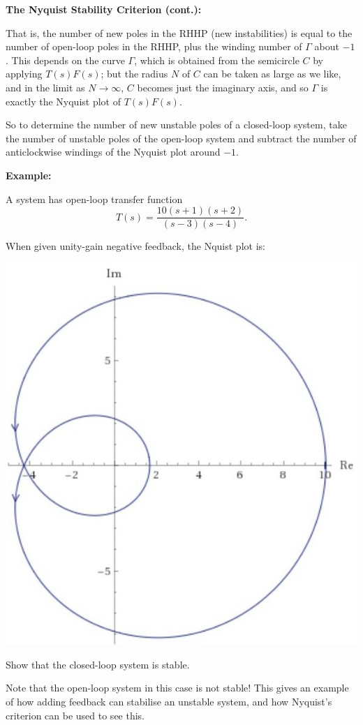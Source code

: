 \documentclass{article}
\begin{document}
\clearpage


\textbf{The Nyquist Stability Criterion (cont.):}\bigskip


That is, the number of new poles in the RHHP (new instabilities) is equal to the number of open-loop poles in the RHHP, plus the winding number of $\Gamma$ about $-1$. This depends on the curve $\Gamma$, which is obtained from the semicircle $C$ by applying $T(s)F(s)$; but the radius $N$ of $C$ can be taken as large as we like, and in the limit as $N\to\infty$, $C$ becomes just the imaginary axis, and so $\Gamma$ is exactly the Nyquist plot of $T(s)F(s)$.\bigskip

So to determine the number of new unstable poles of a closed-loop system, take the number of unstable poles of the open-loop system and subtract the number of anticlockwise windings of the Nyquist plot around $-1$.\bigskip


\textbf{Example:}\medskip


A system has open-loop transfer function
\[T(s)=\frac{10(s+1)(s+2)}{(s-3)(s-4)}.\]

When given unity-gain negative feedback, the Nquist plot is:
\begin{center}
	\includegraphics[scale=0.5]{NyquistExampleCropped.jpg}
\end{center}

Show that the closed-loop system is stable.

Note that the open-loop system in this case is not stable! This gives an example of how adding feedback can stabilise an unstable system, and how Nyquist's criterion can be used to see this.
\end{document}

